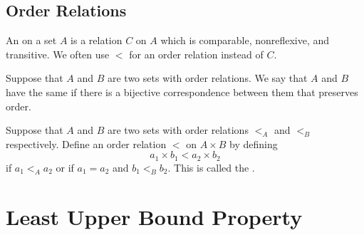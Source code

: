 
\subsection{Order Relations}

\begin{definition}
	An  on a 
	set $A$ is a relation $C$ on $A$ which is comparable, 
	nonreflexive, and transitive. We often use $<$ for an 
	order relation instead of $C$.
\end{definition}

Suppose that $A$ and $B$ are two sets with order 
relations. We say that $A$ and $B$ have the same  if there is a bijective 
correspondence 
between them that preserves order.

\begin{example}
	Suppose that $A$ and $B$ are two sets with order relations 
	$<_A$ and $<_B$ respectively. Define an order relation $<$ on 
	$A \times B$ by defining
	\[
		a_1 \times b_1 < a_2 \times b_2
	\]
	if $a_1 <_A a_2$ or if $a_1 = a_2$ and $b_1 <_B b_2$. This is 
	called the .
\end{example}


\newpage

\section{Least Upper Bound Property}

